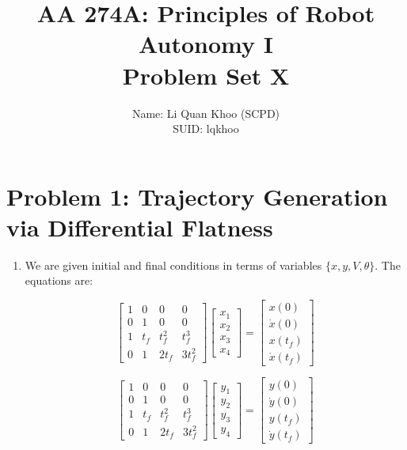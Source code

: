 \documentclass{article}
\title{AA 274A: Principles of Robot Autonomy I \\ Problem Set X}
\author{Name: Li Quan Khoo (SCPD)     \\ SUID: lqkhoo}
\date{}
\begin{document}
\maketitle
\pagestyle{fancy} 

\section*{Problem 1: Trajectory Generation via Differential Flatness}
\begin{enumerate}[label=(\roman*)]
\item %

We are given initial and final conditions in terms of variables $\{x, y, V, \theta\}$. The equations are:

$$
\begin{bmatrix}
1 & 0   & 0      & 0 \\
0 & 1   & 0      & 0 \\
1 & t_f & t_f^2  & t_f^3 \\
0 & 1   & 2 t_f  & 3 t_f^2
\end{bmatrix}
\begin{bmatrix}
x_1 \\ x_2 \\ x_3 \\ x_4
\end{bmatrix}
=
\begin{bmatrix}
x(0) \\ \dot{x}(0) \\ x(t_f) \\ \dot{x}(t_f)
\end{bmatrix}
$$

$$
\begin{bmatrix}
1 & 0   & 0      & 0 \\
0 & 1   & 0      & 0 \\
1 & t_f & t_f^2  & t_f^3 \\
0 & 1   & 2 t_f  & 3 t_f^2
\end{bmatrix}
\begin{bmatrix}
y_1 \\ y_2 \\ y_3 \\ y_4
\end{bmatrix}
=
\begin{bmatrix}
y(0) \\ \dot{y}(0) \\ y(t_f) \\ \dot{y}(t_f)
\end{bmatrix}
$$


\end{enumerate}
\end{document}
